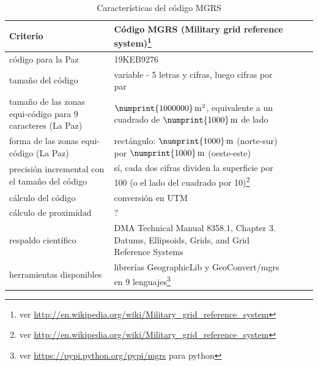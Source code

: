 \documentclass[letterpaper]{article}
\begin{document}
\begin{table}
	\centering
	\begin{tabular}{|l|l|l|l|l|}
		\hline
		Criterio & Código MGRS (Military grid reference system)\footnote{ver 
		\url{http://en.wikipedia.org/wiki/Military_grid_reference_system}} \\
		\hline
		código para la Paz & 19KEB9276 \\
		tamaño del código & variable - 5 letras y cifras, luego cifras 
		por par \\
		tamaño de las zonas equi-código para 9 caracteres (La Paz) & 
		\(\numprint{1000000}\,\mathrm{m^{2}}\), 
		equivalente a un cuadrado de \(\numprint{1000}\,\mathrm{m}\) de lado \\
		forma de las zonas equi-código (La Paz) & rectángulo: 
		\(\numprint{1000}\,\mathrm{m}\) (norte-sur) por 
		\(\numprint{1000}\,\mathrm{m}\) (oeste-este) \\
		precisión incremental con el tamaño del código & sí, cada dos 
		cifras dividen la superficie por 100 (o el lado del cuadrado 
		por 10)\footnote{ver 
		\url{http://en.wikipedia.org/wiki/Military_grid_reference_system}} \\
		cálculo del código & conversión en UTM \\
		cálculo de proximidad & ? \\
		respaldo científico & DMA Technical Manual 8358.1, Chapter 3. Datums, Ellipsoids, Grids, and Grid Reference Systems \\
		herramientas disponibles & librerías GeographicLib y 
		GeoConvert/mgrs en 9 lenguajes\footnote{ver 
		\url{https://pypi.python.org/pypi/mgrs} para python} \\
		\hline
	\end{tabular}
	\caption{Características del código MGRS}
	\label{tab:carac_mgrs}
\end{table}
\end{document}
